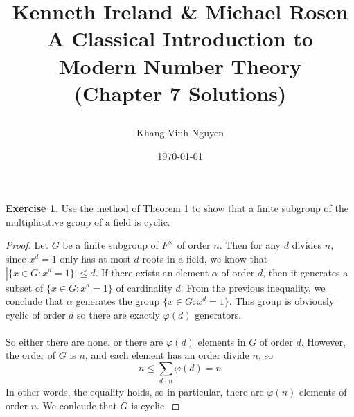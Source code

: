 \documentclass{article}
\title{
	\textbf{Kenneth Ireland \& Michael Rosen \\
		A Classical Introduction to Modern Number Theory \\
		(Chapter 7 Solutions)}
	\author{Khang Vinh Nguyen}
}
\date{\today}
\theoremstyle{definition}
\newtheorem{exercise}{Exercise}
\begin{document}
\maketitle

\newpage

\begin{exercise}
Use the method of Theorem 1 to show that a finite subgroup of the multiplicative group of a field is cyclic.
\end{exercise}
\begin{proof}
Let $G$ be a finite subgroup of $F^\times$ of order $n$. Then for any $d$ divides $n$, since $x^d = 1$ only has at most $d$ roots in a field, we know that $|\{ x \in G : x^d = 1\}| \leq d$. If there exists an element $\alpha$ of order $d$, then it generates a subset of $\{ x \in G : x^d = 1\}$ of cardinality $d$. From the previous inequality, we conclude that $\alpha$ generates the group $\{ x \in G : x^d = 1\}$. This group is obviously cyclic of order $d$ so there are exactly $\varphi(d)$ generators.
\\
\\
So either there are none, or there are $\varphi(d)$ elements in $G$ of order $d$. However, the order of $G$ is $n$, and each element has an order divide $n$, so
$$n \leq \sum_{d \mid n} \varphi(d) = n$$
In other words, the equality holds, so in particular, there are $\varphi(n)$ elements of order $n$. We conlcude that $G$ is cyclic.
\end{proof}

\newpage
\end{document}

